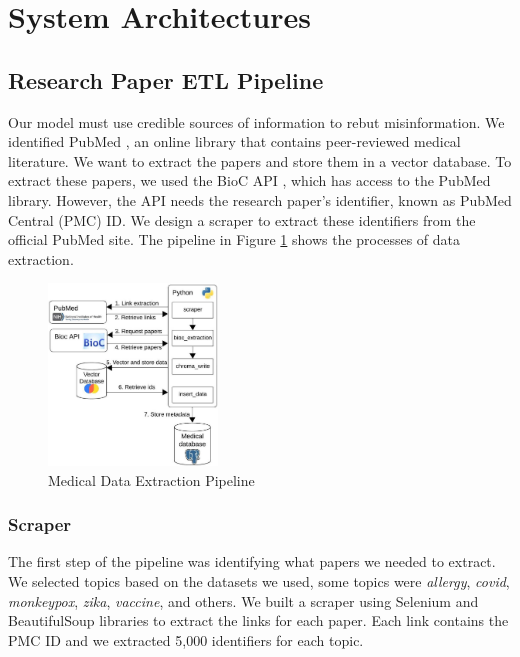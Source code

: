 
\section{System Architectures}


\subsection{Research Paper ETL Pipeline}

Our model must use credible sources of information to rebut misinformation. We identified PubMed \cite{pubmed}, an online library that contains peer-reviewed medical literature. We want to extract the papers and store them in a vector database. To extract these papers, we used the BioC API \cite{bioinformatics}, which has access to the PubMed library. However, the API needs the research paper's identifier, known as PubMed Central (PMC) ID. We design a scraper to extract these identifiers from the official PubMed site. The pipeline in Figure \ref{fig:etl} shows the processes of data extraction. 

\begin{figure}[htbp]
	\begin{center}
		\includegraphics[width=0.4\textwidth]{figures/ETL_Pipeline.jpeg} %
	\end{center}
	\caption{Medical Data Extraction Pipeline} %
	\label{fig:etl}
\end{figure}

\subsubsection{Scraper}
The first step of the pipeline was identifying what papers we needed to extract. We selected topics based on the datasets we used, some topics were \textit{allergy}, \textit{covid}, \textit{monkeypox}, \textit{zika}, \textit{vaccine}, and others. We built a scraper using Selenium and BeautifulSoup libraries to extract the links for each paper. Each link contains the PMC ID and we extracted 5,000 identifiers for each topic.

